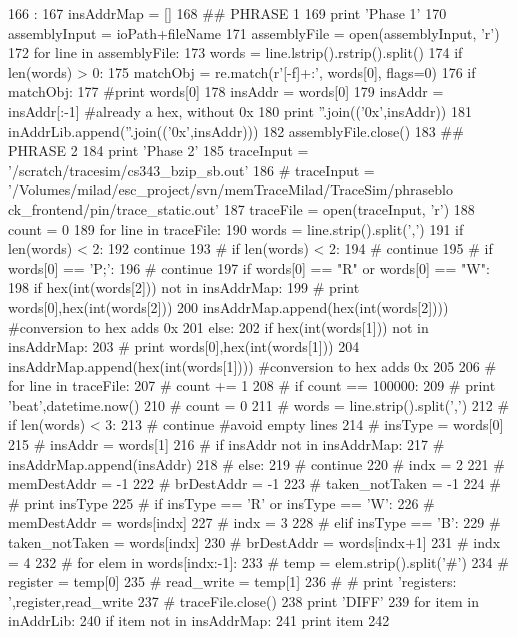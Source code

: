 \begin{DoxyCode}
166            :
167   insAddrMap = []
168   ## PHRASE 1
169   print 'Phase 1'
170   assemblyInput = ioPath+fileName
171   assemblyFile  = open(assemblyInput, 'r')        
172   for line in assemblyFile:
173     words = line.lstrip().rstrip().split()
174     if len(words) > 0:
175       matchObj = re.match(r'[\da-f]+:', words[0], flags=0)
176       if matchObj:
177         #print words[0]
178         insAddr = words[0]
179         insAddr = insAddr[:-1] #already a hex, without 0x
180         print ''.join(('0x',insAddr))
181         inAddrLib.append(''.join(('0x',insAddr)))
182   assemblyFile.close()
183   ## PHRASE 2
184   print 'Phase 2'
185   traceInput = '/scratch/tracesim/cs343_bzip_sb.out'
186   # traceInput = '/Volumes/milad/esc_project/svn/memTraceMilad/TraceSim/phraseblo
      ck_frontend/pin/trace_static.out'
187   traceFile  = open(traceInput, 'r')
188   count = 0
189   for line in traceFile:
190     words = line.strip().split(',')
191     if len(words) < 2:
192       continue
193     # if len(words) < 2:
194     #   continue
195     # if words[0] == 'P;':
196     #   continue
197     if words[0] == "R" or words[0] == "W":
198       if hex(int(words[2])) not in insAddrMap:
199         # print words[0],hex(int(words[2]))
200         insAddrMap.append(hex(int(words[2]))) #conversion to hex adds 0x
201     else:
202       if hex(int(words[1])) not in insAddrMap:
203         # print words[0],hex(int(words[1]))
204         insAddrMap.append(hex(int(words[1]))) #conversion to hex adds 0x
205     
206   # for line in traceFile:
207   #   count += 1
208   #   if count == 100000:
209   #     print 'beat',datetime.now()
210   #     count = 0
211   #   words = line.strip().split(',')
212   #   if len(words) < 3:
213   #     continue #avoid empty lines
214   #   insType = words[0]
215   #   insAddr = words[1]
216   #   if insAddr not in insAddrMap:
217   #     insAddrMap.append(insAddr)
218   #   else:
219   #     continue
220   #   indx = 2
221   #   memDestAddr = -1
222   #   brDestAddr = -1
223   #   taken_notTaken = -1
224   #   # print insType
225   #   if insType == 'R' or insType == 'W':
226   #     memDestAddr = words[indx]
227   #     indx = 3
228   #   elif insType == 'B':
229   #     taken_notTaken = words[indx]
230   #     brDestAddr = words[indx+1]
231   #     indx = 4
232   #   for elem in words[indx:-1]:
233   #     temp = elem.strip().split('#')
234   #     register = temp[0]
235   #     read_write = temp[1]
236   #     # print 'registers: ',register,read_write
237   # traceFile.close()
238   print 'DIFF'
239   for item in inAddrLib:
240     if item not in insAddrMap:
241       print item
242     

\end{DoxyCode}


